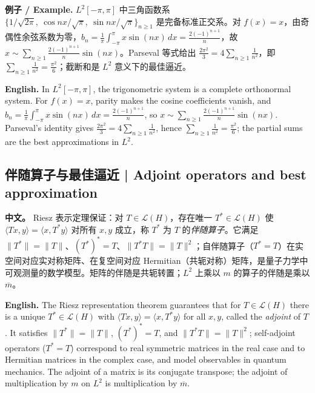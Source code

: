 \documentclass[UTF8,11pt,a4paper]{ctexart}
\newcommand{\EN}[1]{\par\noindent \textbf{English.} #1\par}
\newcommand{\EX}[2]{\par\noindent \textbf{例子 / Example.} #1\par\EN{#2}}
\newcommand{\APS}[2]{\par\noindent\textbf{中文。} #1\par\noindent\textbf{English.} #2\par\smallskip}
\begin{document}
\EX{$L^2[-\pi,\pi]$ 中三角函数系 $\{1/\sqrt{2\pi},\ \cos nx/\sqrt\pi,\ \sin nx/\sqrt\pi\}_{n\ge1}$ 是完备标准正交系。对 $f(x)=x$，由奇偶性余弦系数为零，$b_n=\frac1\pi\int_{-\pi}^{\pi}x\sin(nx)\,dx=\frac{2(-1)^{n+1}}{n}$，故 $x\sim\sum_{n\ge1}\frac{2(-1)^{n+1}}{n}\sin(nx)$。Parseval 等式给出 $\frac{2\pi^2}{3}=4\sum_{n\ge1}\frac1{n^2}$，即 $\sum_{n\ge1}\frac1{n^2}=\frac{\pi^2}{6}$；截断和是 $L^2$ 意义下的最佳逼近。}{In $L^2[-\pi,\pi]$, the trigonometric system is a complete orthonormal system. For $f(x)=x$, parity makes the cosine coefficients vanish, and $b_n=\frac1\pi\int_{-\pi}^{\pi}x\sin(nx)\,dx=\frac{2(-1)^{n+1}}{n}$, so $x\sim\sum_{n\ge1}\frac{2(-1)^{n+1}}{n}\sin(nx)$. Parseval's identity gives $\frac{2\pi^2}{3}=4\sum_{n\ge1}\frac1{n^2}$, hence $\sum_{n\ge1}\frac1{n^2}=\frac{\pi^2}{6}$; the partial sums are the best approximations in $L^2$.}

\subsection{伴随算子与最佳逼近 | Adjoint operators and best approximation}
\APS{Riesz 表示定理保证：对 $T\in\mathcal L(H)$，存在唯一 $T^*\in\mathcal L(H)$ 使 $\langle Tx,y\rangle=\langle x,T^*y\rangle$ 对所有 $x,y$ 成立，称 $T^*$ 为 $T$ 的\emph{伴随算子}。它满足 $\|T^*\|=\|T\|$、$(T^*)^*=T$、$\|T^*T\|=\|T\|^2$；自伴随算子（$T^*=T$）在实空间对应实对称矩阵、在复空间对应 Hermitian（共轭对称）矩阵，是量子力学中可观测量的数学模型。矩阵的伴随是共轭转置；$L^2$ 上乘以 $m$ 的算子的伴随是乘以 $\overline m$。}{The Riesz representation theorem guarantees that for $T\in\mathcal L(H)$ there is a unique $T^*\in\mathcal L(H)$ with $\langle Tx,y\rangle=\langle x,T^*y\rangle$ for all $x,y$, called the \emph{adjoint} of $T$. It satisfies $\|T^*\|=\|T\|$, $(T^*)^*=T$, and $\|T^*T\|=\|T\|^2$; self-adjoint operators ($T^*=T$) correspond to real symmetric matrices in the real case and to Hermitian matrices in the complex case, and model observables in quantum mechanics. The adjoint of a matrix is its conjugate transpose; the adjoint of multiplication by $m$ on $L^2$ is multiplication by $\overline m$.}
\end{document}
